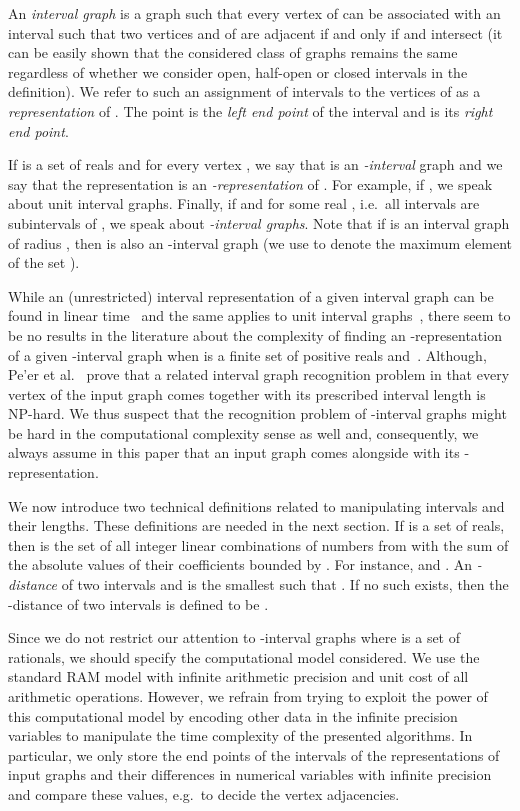 \documentclass{CSML}
\theoremstyle{plain}\newtheorem{claim}[thm]{Claim}
\begin{document}
An {\em interval graph} is a graph  such that
every vertex  of  can be associated with an interval  such that
two vertices  and  of  are adjacent if and only if  and  intersect
(it can be easily shown that the considered class of graphs remains the same regardless of whether we consider open,
half-open or closed intervals in the definition).
We refer to such an assignment of intervals to the vertices of  as a {\em representation} of .
The point  is the {\em left end point} of the interval  and  is its {\em right end point}.

If  is a set of reals and  for every vertex ,
we say that  is an {\em -interval} graph and
we say that the representation is an {\em -representation} of .
For example, if , we speak about unit interval graphs.
Finally, if  and  for some real ,
i.e.~all intervals are subintervals of , we speak about {\em -interval graphs}.
Note that if  is an interval graph of radius , then  is also an -interval graph (we
use  to denote the maximum element of the set ).

While an (unrestricted) interval representation of a given interval graph
 can be found in linear time~\cite{bl76} and the
same applies to unit interval graphs~\cite{cknos95},
there seem to be no results in the literature about the complexity of
finding an -representation of a given -interval graph when 
 is a finite set of positive reals and~.
Although, Pe'er et al.~\cite{ps97} prove that a related
interval graph recognition problem in that every vertex of the input graph 
comes together with its prescribed interval length is NP-hard.
We thus suspect that the recognition problem of -interval graphs might be
hard in the computational complexity sense as well and, consequently, 
we always assume in this paper that an
input graph comes alongside with its -representation.

We now introduce two technical definitions related to manipulating intervals and their lengths.
These definitions are needed in the next section.
If  is a set of reals, then  is the set of all integer linear combinations of numbers from 
with the sum of the absolute values of their coefficients bounded by . For instance,  and
. An {\em -distance} of two intervals  and  is the smallest 
such that . If no such  exists, then the -distance of two intervals
is defined to be .

Since we do not restrict our attention to -interval graphs where  is a set of rationals,
we should specify the computational model considered. We use the standard RAM model
with infinite arithmetic precision and unit cost of all arithmetic operations.
However, we refrain from trying to exploit the power of this computational model
by encoding other data in the infinite precision variables to manipulate the time complexity of the presented algorithms.
In particular,
we only store the end points of the intervals of the representations of input graphs and their differences
in numerical variables with infinite precision and compare these values, e.g.~to decide the vertex adjacencies.
\end{document}
